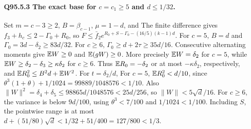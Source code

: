 \paragraph{Q95.5.3 The exact base for \(c=\allowbreak c_1\ge\allowbreak 5\) and \(d\le\allowbreak 1/32\).}
Set \(m=\allowbreak c-3\ge\allowbreak 2\), \(B=\allowbreak \beta_{c-1}\), \(\mu=\allowbreak 1-d\), and
The finite difference gives \(f_3+h_c\le\allowbreak 2-\Gamma_0+R_0\), so
\(F\le\allowbreak \bar f_2e^{R_0+S-\Gamma_0-(16/5)(k-1)d}\).
For \(c=\allowbreak 5\), \(B=\allowbreak d\) and \(\Gamma_0=\allowbreak 3d-\delta_2\ge\allowbreak 83d/32\).
For \(c\ge\allowbreak 6\), \(\Gamma_0\ge\allowbreak  d+2\tau\ge\allowbreak 35d/16\).
Consecutive alternating moments give \(\mathbb E W\ge\allowbreak 0\) and \(\mathbb E(gW)\ge\allowbreak 0\).
More precisely \(\mathbb E W=\allowbreak \delta_2\) for \(c=\allowbreak 5\), while
\(\mathbb E W\ge\allowbreak \delta_2-\delta_3\ge\allowbreak \kappa\delta_2\) for \(c\ge\allowbreak 6\).
Thus \(\mathbb E R_0=\allowbreak -\delta_2\) or at most \(-\kappa\delta_2\), respectively,
and \(\mathbb E R_0^2\le\allowbreak  B^2d+\mathbb E W^2\). For \(t=\allowbreak \delta_2/d\),
For \(c=\allowbreak 5\), \(\mathbb E R_0^2<\allowbreak d/10\), since
\(\theta^3(1+\theta)+1/1024=\allowbreak 99889/1048576<\allowbreak 1/10\).
Also \(\|W\|^2=\allowbreak \delta_4+\delta_5\le\allowbreak 98865d/1048576<\allowbreak 25d/256\),
so \(\|W\|<\allowbreak 5\sqrt d/16\).
For \(c\ge\allowbreak 6\), the variance is below \(9d/100\), using
\(\theta^3<\allowbreak 7/100\) and \(1/1024<\allowbreak 1/100\).
Including \(S\), the pointwise range is at most
\(d+(51/80)\sqrt d<\allowbreak 1/32+51/400=\allowbreak 127/800<\allowbreak 1/3\).

